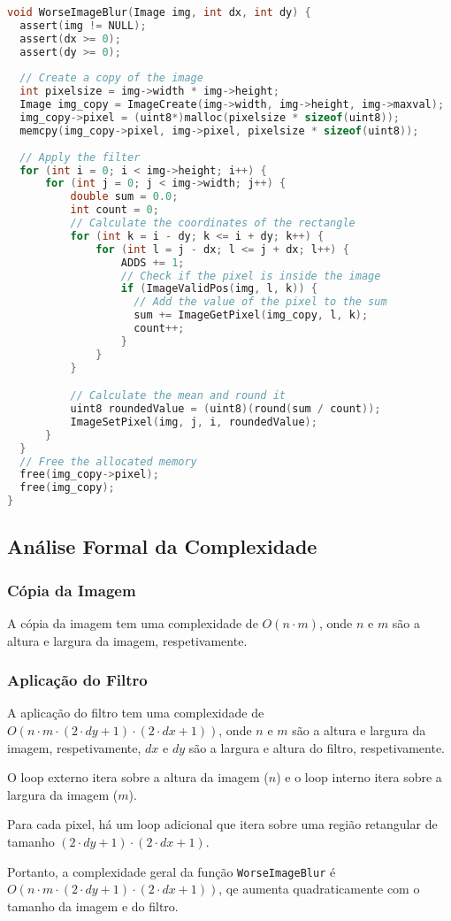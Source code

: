 \documentclass{report}
\begin{document}
\begingroup
\begin{lstlisting}[language=C]
void WorseImageBlur(Image img, int dx, int dy) {
  assert(img != NULL);
  assert(dx >= 0);
  assert(dy >= 0);
  
  // Create a copy of the image
  int pixelsize = img->width * img->height;
  Image img_copy = ImageCreate(img->width, img->height, img->maxval);
  img_copy->pixel = (uint8*)malloc(pixelsize * sizeof(uint8));
  memcpy(img_copy->pixel, img->pixel, pixelsize * sizeof(uint8));
  
  // Apply the filter
  for (int i = 0; i < img->height; i++) {
      for (int j = 0; j < img->width; j++) {
          double sum = 0.0;
          int count = 0;
          // Calculate the coordinates of the rectangle
          for (int k = i - dy; k <= i + dy; k++) {
              for (int l = j - dx; l <= j + dx; l++) {
                  ADDS += 1;
                  // Check if the pixel is inside the image
                  if (ImageValidPos(img, l, k)) {
                    // Add the value of the pixel to the sum
                    sum += ImageGetPixel(img_copy, l, k);
                    count++;
                  }
              }
          }

          // Calculate the mean and round it
          uint8 roundedValue = (uint8)(round(sum / count));
          ImageSetPixel(img, j, i, roundedValue);
      }
  }
  // Free the allocated memory
  free(img_copy->pixel);
  free(img_copy);
}
\end{lstlisting}
\endgroup

\subsection{Análise Formal da Complexidade}

\subsubsection{Cópia da Imagem}
A cópia da imagem tem uma complexidade de \(O(n \cdot m)\), onde \(n\) e \(m\) são a altura e largura da imagem, respetivamente.

\subsubsection{Aplicação do Filtro}
A aplicação do filtro tem uma complexidade de \(O(n \cdot m \cdot (2 \cdot dy + 1) \cdot (2 \cdot dx + 1))\), 
onde \(n\) e \(m\) são a altura e largura da imagem, respetivamente, 
\(dx\) e \(dy\) são a largura e altura do filtro, respetivamente.
\par
O loop externo itera sobre a altura da imagem (\(n\)) e o loop interno itera sobre a largura da imagem (\(m\)).
\par
Para cada pixel, há um loop adicional que itera sobre uma região retangular de tamanho \((2 \cdot dy + 1) \cdot (2 \cdot dx + 1)\).
\par
Portanto, a complexidade geral da função \texttt{WorseImageBlur} é \(O(n \cdot m \cdot (2 \cdot dy + 1) \cdot (2 \cdot dx + 1))\), 
qe aumenta quadraticamente com o tamanho da imagem e do filtro.
\end{document}
